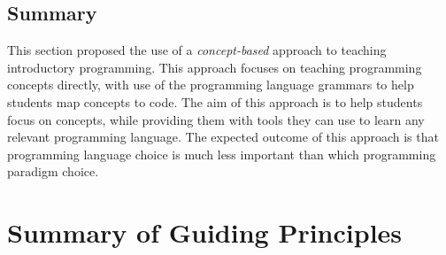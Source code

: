 


\subsection{Summary} %
\label{ssub:summary_of_principles_for_what_to_teach}

This section proposed the use of a \emph{concept-based} approach to teaching introductory programming. This approach focuses on teaching programming concepts directly, with use of the programming language grammars to help students map concepts to code. The aim of this approach is to help students focus on concepts, while providing them with tools they can use to learn any relevant programming language. The expected outcome of this approach is that programming language choice is much less important than which programming paradigm choice. 


\section{Summary of Guiding Principles} %
\label{sec:summary_of_guiding_principles}



